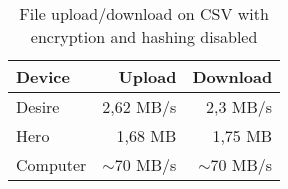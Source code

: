 \begin{table}
  \centering
  \caption{File upload/download on CSV with encryption and hashing disabled}
  \begin{tabular}{ | l | r | r |}
    \hline
    \textbf{Device}    &   \textbf{Upload}  &   \textbf{Download}   \\ \hline
    Desire & 2,62 MB/s & 2,3 MB/s \\ \hline
    Hero & 1,68 MB & 1,75 MB \\ \hline
    Computer & $\sim$70 MB/s & $\sim$70 MB/s \\ \hline
  \end{tabular}
  \label{tbl:files:unencrypted}
\end{table}
